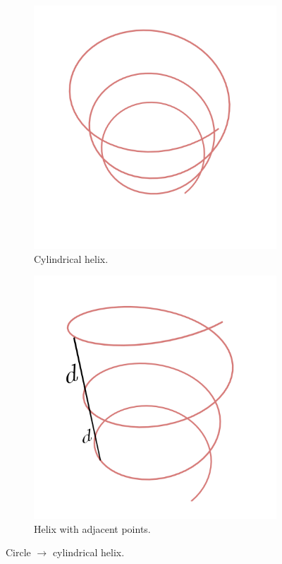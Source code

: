 \documentclass{article}
\begin{document}
\begin{figure}[h!]
\begin{subfigure}{0.3\linewidth}
        \includegraphics[width=\linewidth]{Blender/helixcb.png}
        \caption{Cylindrical helix.}
        \label{fig:helixcb}
    \end{subfigure}
    \begin{subfigure}{0.3\linewidth}
        \includegraphics[width=\linewidth]{Blender/helixcc.png}
        \caption{Helix with adjacent points.}
        \label{fig:helixcc}
    \end{subfigure}
    \caption{Circle $\longrightarrow$ cylindrical helix.}
    \label{fig:helixc}
\end{figure}
\end{document}
